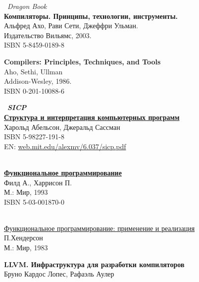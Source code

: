 \begin{thebibliography}{99}


 \ \emph{Dragon Book}\\
\textbf{Компиляторы. Принципы, технологии, инструменты.}\\
Альфред Ахо, Рави Сети, Джеффри Ульман.\\
Издательство Вильямс, 2003.\\ ISBN 5-8459-0189-8

 \textbf{Compilers: Principles, Techniques, and Tools}\\
Aho, Sethi, Ullman\\Addison-Wesley, 1986.\\ISBN 0-201-10088-6

 \ \textbf{\emph{SICP}\\
\href{https://drive.google.com/file/d/0B0u4WeMjO894X3lnWmhjUktKRk0/view?usp=sharing}{Структура
и интерпретация компьютерных программ}}\\
Харольд Абельсон, Джеральд Сассман\\
ISBN 5-98227-191-8\\
EN: \url{web.mit.edu/alexmv/6.037/sicp.pdf}

 \\
\href{https://drive.google.com/file/d/0B0u4WeMjO894b2UxcmVvdi01TEU/view?usp=sharing}{\textbf{Функциональное
программирование}}\\
Филд А., Харрисон П.\\
М.: Мир, 1993\\ISBN 5-03-001870-0

 \\
\href{https://drive.google.com/file/d/0B0u4WeMjO894VHhRb0tfTWNWV1k/view?usp=sharing}{Функциональное
программирование: применение и реализация}\\
П.Хендерсон\\
М.: Мир, 1983

 
\textbf{LLVM. Инфраструктура для разработки компиляторов}\\
Бруно Кардос Лопес, Рафаэль Аулер





\end{thebibliography}
